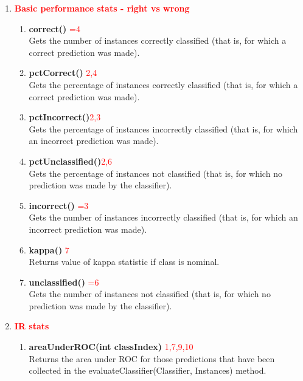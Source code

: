 \documentclass[a4paper,12pt]{article}
\begin{document}
\begin{enumerate}

\item \textbf{\textcolor{red}{Basic performance stats - right vs wrong}}
\begin{enumerate}
              
\item \textbf{correct()} \textcolor{red}{=4}
          \\Gets the number of instances correctly classified (that is, for which a correct prediction was made).
          
\item \textbf{pctCorrect()} \textcolor{red}{2,4}
          \\Gets the percentage of instances correctly classified (that is, for which a correct prediction was made). 

\item \textbf{pctIncorrect()}\textcolor{red}{2,3}
          \\Gets the percentage of instances incorrectly classified (that is, for which an incorrect prediction was made).

\item \textbf{pctUnclassified()}\textcolor{red}{2,6}
          \\Gets the percentage of instances not classified (that is, for which no prediction was made by the classifier). 

\item \textbf{incorrect()} \textcolor{red}{=3}
          \\Gets the number of instances incorrectly classified (that is, for which an incorrect prediction was made). 
          
\item \textbf{kappa()} \textcolor{red}{7}
          \\Returns value of kappa statistic if class is nominal. 
          
\item \textbf{unclassified()} \textcolor{red}{=6}
          \\Gets the number of instances not classified (that is, for which no prediction was made by the classifier).
\end{enumerate}    

\item  \textbf{\textcolor{red}{IR stats}}
\begin{enumerate}          
\item \textbf{areaUnderROC(int classIndex)} \textcolor{red}{1,7,9,10}
          \\Returns the area under ROC for those predictions that have been collected in the evaluateClassifier(Classifier, Instances) method. 
          

\end{enumerate}
\end{enumerate}
\end{document}
